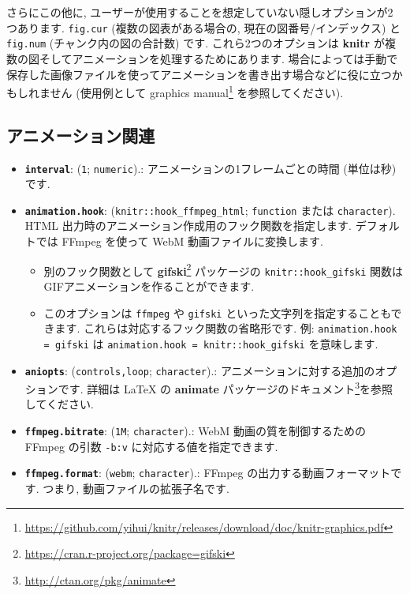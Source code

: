 \documentclass[
  11pt,
  lualatex,ja=standard,jafont=noto]{bxjsreport}
\providecommand{\tightlist}{%
  \setlength{\itemsep}{0pt}\setlength{\parskip}{0pt}}
\renewcommand{\href}[2]{#2\footnote{\url{#1}}}
\begin{document}
さらにこの他に, ユーザーが使用することを想定していない隠しオプションが2つあります. \texttt{fig.cur} (複数の図表がある場合の, 現在の図番号/インデックス) と \texttt{fig.num} (チャンク内の図の合計数) です. これら2つのオプションは \textbf{knitr} が複数の図そしてアニメーションを処理するためにあります. 場合によっては手動で保存した画像ファイルを使ってアニメーションを書き出す場合などに役に立つかもしれません (使用例として \href{https://github.com/yihui/knitr/releases/download/doc/knitr-graphics.pdf}{graphics manual} を参照してください).

\hypertarget{animation-options}{%
\subsection{アニメーション関連}\label{animation-options}}

\begin{itemize}
\tightlist
\item
  \textbf{\texttt{interval}}: (\texttt{1}; \texttt{numeric}).: アニメーションの1フレームごとの時間 (単位は秒) です.
\item
  \textbf{\texttt{animation.hook}}: (\texttt{knitr::hook\_ffmpeg\_html}; \texttt{function} または \texttt{character}). HTML 出力時のアニメーション作成用のフック関数を指定します. デフォルトでは FFmpeg を使って WebM 動画ファイルに変換します.

  \begin{itemize}
  \tightlist
  \item
    別のフック関数として \href{https://cran.r-project.org/package=gifski}{\textbf{gifski}} パッケージの \texttt{knitr::hook\_gifski} 関数はGIFアニメーションを作ることができます.
  \item
    このオプションは \texttt{\textquotesingle{}ffmpeg\textquotesingle{}} や \texttt{\textquotesingle{}gifski\textquotesingle{}} といった文字列を指定することもできます. これらは対応するフック関数の省略形です. 例: \texttt{animation.hook = \textquotesingle{}gifski\textquotesingle{}} は \texttt{animation.hook = knitr::hook\_gifski} を意味します.
  \end{itemize}
\item
  \textbf{\texttt{aniopts}}: (\texttt{\textquotesingle{}controls,loop\textquotesingle{}}; \texttt{character}).: アニメーションに対する追加のオプションです. 詳細は LaTeX の \href{http://ctan.org/pkg/animate}{\textbf{animate} パッケージのドキュメント}を参照してください.
\item
  \textbf{\texttt{ffmpeg.bitrate}}: (\texttt{1M}; \texttt{character}).: WebM 動画の質を制御するための FFmpeg の引数 \texttt{-b:v} に対応する値を指定できます.
\item
  \textbf{\texttt{ffmpeg.format}}: (\texttt{webm}; \texttt{character}).: FFmpeg の出力する動画フォーマットです. つまり, 動画ファイルの拡張子名です.
\end{itemize}
\end{document}

